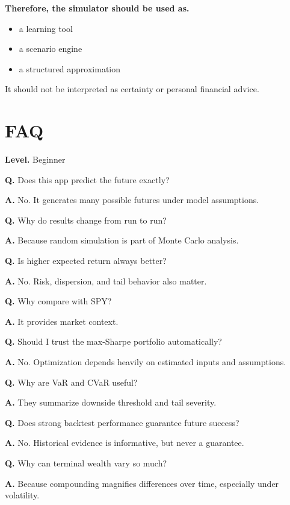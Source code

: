\documentclass[11pt]{report}
\begin{document}
\textbf{Therefore, the simulator should be used as.}

\begin{itemize}
\item a learning tool
\item a scenario engine
\item a structured approximation
\end{itemize}

It should not be interpreted as certainty or personal financial advice.

\section{FAQ}
\begin{callout}
\textbf{Level.} Beginner
\end{callout}

\begin{callout}
\textbf{Q.} Does this app predict the future exactly?

\textbf{A.} No. It generates many possible futures under model assumptions.
\end{callout}

\begin{callout}
\textbf{Q.} Why do results change from run to run?

\textbf{A.} Because random simulation is part of Monte Carlo analysis.
\end{callout}

\begin{callout}
\textbf{Q.} Is higher expected return always better?

\textbf{A.} No. Risk, dispersion, and tail behavior also matter.
\end{callout}

\begin{callout}
\textbf{Q.} Why compare with SPY?

\textbf{A.} It provides market context.
\end{callout}

\begin{callout}
\textbf{Q.} Should I trust the max-Sharpe portfolio automatically?

\textbf{A.} No. Optimization depends heavily on estimated inputs and assumptions.
\end{callout}

\begin{callout}
\textbf{Q.} Why are VaR and CVaR useful?

\textbf{A.} They summarize downside threshold and tail severity.
\end{callout}

\begin{callout}
\textbf{Q.} Does strong backtest performance guarantee future success?

\textbf{A.} No. Historical evidence is informative, but never a guarantee.
\end{callout}

\begin{callout}
\textbf{Q.} Why can terminal wealth vary so much?

\textbf{A.} Because compounding magnifies differences over time, especially under volatility.
\end{callout}
\end{document}
